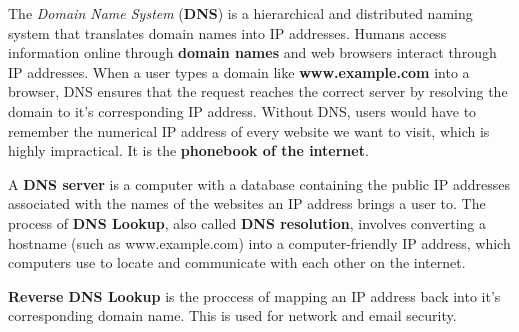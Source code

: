 The \textit{Domain Name System} (\textbf{DNS}) is a hierarchical and distributed naming system that translates domain names into IP addresses. Humans access information online through \textbf{domain names} and web browsers interact through IP addresses. When a user types a domain like \textbf{www.example.com} into a browser, DNS ensures that the request reaches the correct server by resolving the domain to it's corresponding IP address. Without DNS, users would have to remember the numerical IP address of every website we want to visit, which is highly impractical. It is the \textbf{phonebook of the internet}.

A \textbf{DNS server} is a computer with a database containing the public IP addresses associated with the names of the websites an IP address brings  a user to. The process of \textbf{DNS Lookup}, also called \textbf{DNS resolution}, involves converting a hostname (such as www.example.com) into a computer-friendly IP address, which computers use to locate and communicate with each other on the internet.

\textbf{Reverse DNS Lookup} is the proccess of mapping an IP address back into it's corresponding domain name. This is used for network and email security.
